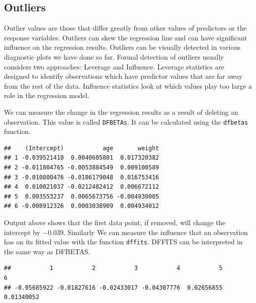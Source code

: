 \documentclass[11pt, letterpaper, twoside]{memoir}\usepackage{knitr}
\begin{document}
\subsection{Outliers}

Outlier values are those that differ greatly from other values of predictors or the response variables. Outliers can skew the regression line and can have significant influence on the regression results. Outliers can be visually detected in various diagnostic plots we have done so far. Formal detection of outliers usually considers two approaches: Leverage and Influence. Leverage statistics are designed to identify observations which have predictor values that are far away from the rest of the data. Influence statistics look at which values play too large a role in the regression model.

We can measure the change in the regression results as a result of deleting an observation. This value is called \texttt{DFBETAs}. It can be calculated using the \texttt{dfbetas}  function.

\begin{knitrout}
\color{fgcolor}\begin{kframe}
\begin{alltt}
 \hlkwb{<-} 
\end{alltt}
\begin{verbatim}
##    (Intercept)           age       weight
## 1 -0.039521410  0.0040605801  0.017320382
## 2 -0.011804765 -0.0053884549  0.009100589
## 3 -0.010800476 -0.0186179048  0.016753416
## 4  0.010021037 -0.0212482412  0.006672112
## 5  0.003553237  0.0065673756 -0.004930005
## 6 -0.008912326  0.0003038909  0.004934012
\end{verbatim}
\end{kframe}
\end{knitrout}

Output above shows that the first data point, if removed, will change the intercept by $-0.039$. Similarly We can measure the influence that an observation has on its fitted value with the function \texttt{dffits}.  DFFITS can be interpreted in the same way as DFBETAS.

\begin{knitrout}
\color{fgcolor}\begin{kframe}
\begin{alltt}
 \hlkwb{<-} 
\end{alltt}
\begin{verbatim}
##           1           2           3           4           5           6 
## -0.05685922 -0.01827616 -0.02433017 -0.04307776  0.02656855  0.01340052
\end{verbatim}
\end{kframe}
\end{knitrout}
\end{document}
